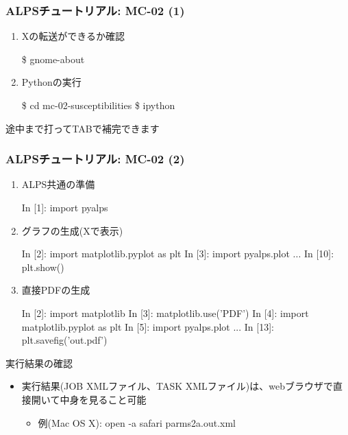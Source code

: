 \begin{frame}[fragile]
  \frametitle{ALPSチュートリアル: MC-02 (1)}
  \begin{enumerate}
  \item<1-> Xの転送ができるか確認
\begin{semiverbatim}
 \$ gnome-about
\end{semiverbatim}
  \item<1-> Pythonの実行
\begin{semiverbatim}
 \$ cd mc-02-susceptibilities
 \$ ipython
\end{semiverbatim}
  \end{enumerate}
  \begin{center}
    \begin{alertbox}
      途中まで打ってTABで補完できます
    \end{alertbox}
  \end{center}
\end{frame}

\begin{frame}[fragile,shrink=5]
  \frametitle{ALPSチュートリアル: MC-02 (2)}
  \begin{enumerate}
  \item<2-> ALPS共通の準備
\begin{semiverbatim}
In [1]: import pyalps
\end{semiverbatim}
  \item<3-> グラフの生成(Xで表示)
\begin{semiverbatim}
In [2]: import matplotlib.pyplot as plt
In [3]: import pyalps.plot
...
In [10]: plt.show()
\end{semiverbatim}
  \item<3-> 直接PDFの生成
\begin{semiverbatim}
In [2]: import matplotlib
In [3]: matplotlib.use('PDF')
In [4]: import matplotlib.pyplot as plt
In [5]: import pyalps.plot
...
In [13]: plt.savefig('out.pdf')
\end{semiverbatim}
  \end{enumerate}
\end{frame}

\begin{frame}{実行結果の確認}
  \begin{itemize}
    \item 実行結果(JOB XMLファイル、TASK XMLファイル)は、webブラウザで直接開いて中身を見ること可能
      \begin{itemize}
      \item 例(Mac OS X): open -a safari parms2a.out.xml
      \end{itemize}
  \end{itemize}
\end{frame}


